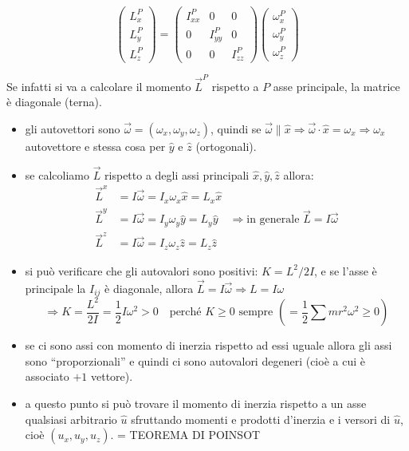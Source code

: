 \documentclass[12pt]{article}
\begin{document}
\vspace{0.5cm}
\begin{minipage}{0.5\textwidth}
$$
\begin{pmatrix}
L_x^P \\ L_y^P \\ L_z^P
\end{pmatrix}
=
\begin{pmatrix}
I_{xx}^P & 0 & 0 \\
0 & I_{yy}^P & 0 \\
0 & 0 & I_{zz}^P
\end{pmatrix}
\begin{pmatrix}
\omega_x^P \\ \omega_y^P \\ \omega_z^P
\end{pmatrix}
$$
\end{minipage}
\begin{minipage}{0.45\textwidth}
Se infatti si va a calcolare il momento $\vec{L}^P$ rispetto a $P$ asse principale, la matrice è diagonale (terna).
\end{minipage}

\vspace{0.5cm}
\begin{itemize}
    \item gli autovettori sono $\vec{\omega} = (\omega_x, \omega_y, \omega_z)$, quindi se $\vec{\omega} \parallel \hat{x} \Rightarrow \vec{\omega} \cdot \hat{x} = \omega_x \Rightarrow \omega_x$ autovettore e stessa cosa per $\hat{y}$ e $\hat{z}$ (ortogonali).
    \item se calcoliamo $\vec{L}$ rispetto a degli assi principali $\hat{x}, \hat{y}, \hat{z}$ allora:
    \begin{align*}
    \vec{L}^x &= I \vec{\omega} = I_x \omega_x \hat{x} = L_x \hat{x} \\
    \vec{L}^y &= I \vec{\omega} = I_y \omega_y \hat{y} = L_y \hat{y} \quad \Rightarrow \text{in generale } \vec{L} = I \vec{\omega} \\
    \vec{L}^z &= I \vec{\omega} = I_z \omega_z \hat{z} = L_z \hat{z}
    \end{align*}
    \item si può verificare che gli autovalori sono positivi: $K = L^2 / 2I$, e se l'asse è principale la $I_{ij}$ è diagonale, allora $\vec{L} = I \vec{\omega} \Rightarrow L = I \omega$
    $$ \Rightarrow K = \frac{L^2}{2I} = \frac{1}{2} I \omega^2 > 0 \quad \text{perché } K \geq 0 \text{ sempre } \left(= \frac{1}{2} \sum m r^2 \omega^2 \geq 0\right) $$
    \item se ci sono assi con momento di inerzia rispetto ad essi uguale allora gli assi sono ``proporzionali'' e quindi ci sono autovalori degeneri (cioè a cui è associato $+1$ vettore).
    \item a questo punto si può trovare il momento di inerzia rispetto a un asse qualsiasi arbitrario $\hat{u}$ sfruttando momenti e prodotti d'inerzia e i versori di $\hat{u}$, cioè $(u_x, u_y, u_z)$. = TEOREMA DI POINSOT
\end{itemize}
\end{document}
